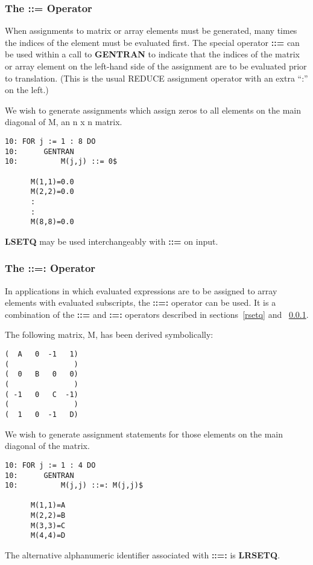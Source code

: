 \subsubsection{The ::= Operator}
\label{lsetq}
When assignments to matrix or array elements must be generated, many
times the indices of the element must be evaluated first.  The special operator
\index{::=} 
{\bf ::=} can be used within a call to {\bf GENTRAN}
to indicate that the indices of the matrix or
array element on the left-hand side of the assignment are to
be evaluated prior to translation.  (This is the usual REDUCE
assignment operator with an extra ``:'' on the left.)
\begin{describe}{\example}
We wish to generate assignments which assign zeros to all elements
on the main diagonal of M, an n x n matrix.
\begin{verbatim}
10: FOR j := 1 : 8 DO 
10:      GENTRAN 
10:          M(j,j) ::= 0$

      M(1,1)=0.0
      M(2,2)=0.0
      :
      :
      M(8,8)=0.0
\end{verbatim}
\end{describe}

{\bf LSETQ} may be used interchangeably with {\bf ::=} on input.
\subsubsection{The ::=: Operator}
\label{lrsetq}
\index{::=:}  
In applications in which evaluated expressions are to be assigned to
array elements with evaluated subscripts, the {\bf ::=:} operator can be
used.  It is a combination of the {\bf ::=} and {\bf :=:} operators described
in sections~\ref{rsetq} and ~\ref{lsetq}.

\newpage
\begin{describe}{\example}
The following matrix, M, has been derived symbolically:
\begin{verbatim}
(  A   0  -1   1)
(               )
(  0   B   0   0)
(               )
( -1   0   C  -1)
(               )
(  1   0  -1   D)
\end{verbatim}
We wish to generate assignment statements for those elements
on the main diagonal of the matrix.
\begin{verbatim}
10: FOR j := 1 : 4 DO 
10:      GENTRAN 
10:          M(j,j) ::=: M(j,j)$

      M(1,1)=A
      M(2,2)=B
      M(3,3)=C
      M(4,4)=D
\end{verbatim}
\end{describe}
The alternative alphanumeric identifier associated with {\bf ::=:} is 
{\bf LRSETQ}.

